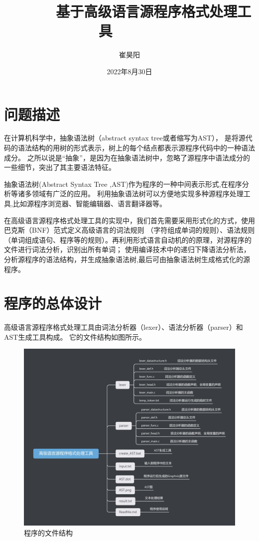 \documentclass[supercite]{Experimental_Report}
\title{~~~~~~基于高级语言源程序格式处理工具~~~~~~}
\author{崔昊阳}
\date{2022年8月30日}
\theoremstyle{definition}
\begin{document}
\maketitle

\clearpage


\tableofcontents[level=2]

\clearpage


\section{问题描述}

在计算机科学中，抽象语法树（abstract syntax tree或者缩写为AST），
是将源代码的语法结构的用树的形式表示，树上的每个结点都表示源程序代码中的一种语法成分。
之所以说是“抽象”，是因为在抽象语法树中，忽略了源程序中语法成分的一些细节，突出了其主要语法特征。

抽象语法树(Abstract Syntax Tree ,AST)作为程序的一种中间表示形式,在程序分析等诸多领域有广泛的应用。
利用抽象语法树可以方便地实现多种源程序处理工具,比如源程序浏览器、智能编辑器、语言翻译器等。

在高级语言源程序格式处理工具的实现中，我们首先需要采用形式化的方式，使用巴克斯（BNF）范式定义高级语言的词法规则
（字符组成单词的规则）、语法规则（单词组成语句、程序等的规则）。再利用形式语言自动机的的原理，对源程序的文件进行词法分析，识别出所有单词；
使用编译技术中的递归下降语法分析法，分析源程序的语法结构，并生成抽象语法树,最后可由抽象语法树生成格式化的源程序。
\newpage
\section{程序的总体设计}

高级语言源程序格式处理工具由词法分析器（lexer）、语法分析器（parser）和AST生成工具构成。
它的文件结构如图所示。
\begin{figure}[htb]
	\begin{center}
		\includegraphics[scale=0.2]{images/高级语言源程序格式处理工具.pdf}
		\caption{程序的文件结构}
		\label{fig1-1}
	\end{center}
\end{figure}
\end{document}
